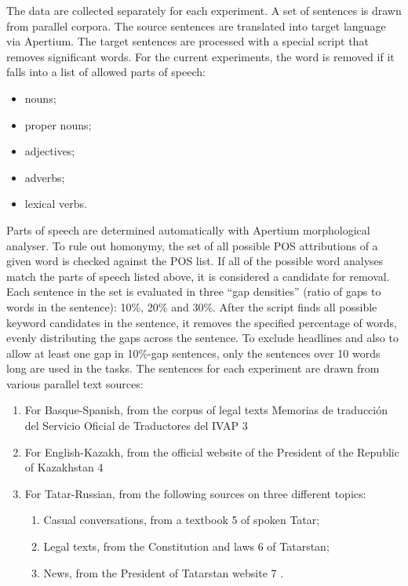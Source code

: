 \documentclass[11pt]{article}
\begin{document}
The data are collected separately for each experiment. A set of sentences is drawn from
parallel corpora. The source sentences are translated into target language via Apertium.
The target sentences are processed with a special script that removes significant words.
For the current experiments, the word is removed if it falls into a list of allowed parts of
speech:
\begin{itemize}
\item nouns;
\item proper nouns;
\item adjectives;
\item adverbs;
\item lexical verbs.
\end{itemize}
Parts of speech are determined automatically with Apertium morphological analyser. To
rule out homonymy, the set of all possible POS attributions of a given word is checked
against the POS list. If all of the possible word analyses match the parts of speech listed
above, it is considered a candidate for removal.
Each sentence in the set is evaluated in three “gap densities” (ratio of gaps to words in the
sentence): 10\%, 20\% and 30\%. After the script finds all possible keyword candidates in
the sentence, it removes the specified percentage of words, evenly distributing the gaps
across the sentence.
To exclude headlines and also to allow at least one gap in 10\%-gap sentences, only the
sentences over 10 words long are used in the tasks.
The sentences for each experiment are drawn from various parallel text sources:
\begin{enumerate}
\item  For Basque-Spanish, from the corpus of legal texts Memorias de traducción del
Servicio Oficial de Traductores del IVAP 3
\item  For English-Kazakh, from the official website of the President of the Republic of
Kazakhstan 4
\item  For Tatar-Russian, from the following sources on three different topics:
  \begin{enumerate}
    \item  Casual conversations, from a textbook 5 of spoken Tatar;
    \item  Legal texts, from the Constitution and laws 6 of Tatarstan;
    \item  News, from the President of Tatarstan website 7 .
  \end{enumerate}
\end{enumerate}
\end{document}
